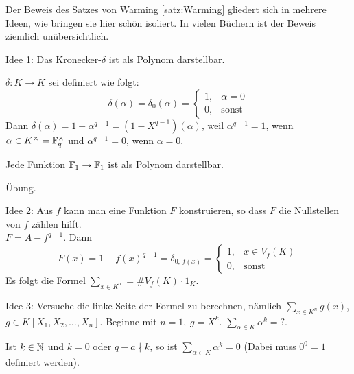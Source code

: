 \documentclass[a4paper,twoside,DIV15,BCOR12mm]{scrbook}
\begin{document}
\begin{beweis}
Der Beweis des Satzes von Warming \ref{satz:Warming} gliedert sich
in mehrere Ideen, wie bringen sie hier schön isoliert. In vielen
Büchern ist der Beweis ziemlich unübersichtlich.
\begin{description}
    \item{Idee 1:} Das Kronecker-$\delta$ ist als Polynom darstellbar.

        \begin{lemma}\label{lemma:BeweisWarmingLemma1}
            $\delta:K\to K$ sei definiert wie folgt:
            \[\delta(\alpha)=\delta_0(\alpha)=\begin{cases}1,&\alpha=0\\0,&\text{sonst}\end{cases}\]
            Dann
            $\delta(\alpha)=1-\alpha^{q-1}=(1-X^{q-1})(\alpha)$,
            weil $\alpha^{q-1}=1$, wenn $\alpha \in
            K^{\times}=\mathbb{F}_q^{\times}$ und $\alpha^{q-1}=0$, wenn
            $\alpha=0$.
        \end{lemma}
        \begin{satz}
            Jede Funktion $\mathbb{F}_1 \to \mathbb{F}_1$ ist als Polynom
            darstellbar.
        \end{satz}
        \begin{beweis} Übung. \end{beweis}
    \item{Idee 2:} Aus $f$ kann man eine Funktion $F$ konstruieren, so
    dass $F$ die Nullstellen von $f$ zählen hilft.\\
    $F=A-f^{q-1}$. Dann
    \[F(x)=1-f(x)^{q-1}=\delta_{0,\,f(x)}=\begin{cases}1,&x\in
    V_f(K)\\0,&\text{sonst}\end{cases}\]
    Es folgt die Formel $\sum_{x\in K^n}=\# V_f(K) \cdot 1_K$.
    \item{Idee 3:} Versuche die linke Seite der Formel zu
    berechnen, nämlich $\sum_{x\in K^n}g(x)$, $
    {g\in K[X_1,X_2,\dotsc,X_n]}$. Beginne mit $n=1,\ g=X^k$.
    $\sum_{\alpha \in K}\alpha^k=?$.
    \begin{lemma}\label{lemma:BeweisWarmingLemma2}
        Ist $k\in \mathbb{N}$ und $k=0$ oder $q-a \nmid k$, so ist $\sum_{\alpha \in K}
        \alpha^k=0$ (Dabei muss $0^0=1$ definiert werden).
    \end{lemma}
\end{description}
\end{beweis}
\end{document}

